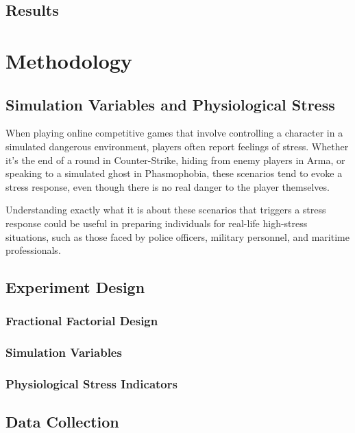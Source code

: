 \documentclass[12pt]{article}
\begin{document}
\subsection{Results}

\section{Methodology}

\subsection{Simulation Variables and Physiological Stress}

When playing online competitive games that involve controlling a character in a simulated dangerous environment, players often report feelings of stress. Whether it's the end of a round in Counter-Strike, hiding from enemy players in Arma, or speaking to a simulated ghost in Phasmophobia, these scenarios tend to evoke a stress response, even though there is no real danger to the player themselves.

Understanding exactly what it is about these scenarios that triggers a stress response could be useful in preparing individuals for real-life high-stress situations, such as those faced by police officers, military personnel, and maritime professionals.

\subsection{Experiment Design}

\subsubsection{Fractional Factorial Design}



\subsubsection{Simulation Variables}

\subsubsection{Physiological Stress Indicators}

\subsection{Data Collection}
\end{document}
